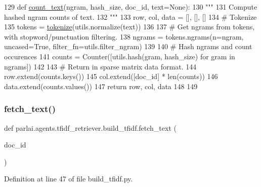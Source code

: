 \begin{DoxyCode}
129 \textcolor{keyword}{def }\hyperlink{namespaceparlai_1_1agents_1_1tfidf__retriever_1_1build__tfidf_a76bae1c966a21d123cb91949d6c8ec20}{count\_text}(ngram, hash\_size, doc\_id, text=None):
130     \textcolor{stringliteral}{"""}
131 \textcolor{stringliteral}{    Compute hashed ngram counts of text.}
132 \textcolor{stringliteral}{    """}
133     row, col, data = [], [], []
134     \textcolor{comment}{# Tokenize}
135     tokens = \hyperlink{namespaceparlai_1_1agents_1_1tfidf__retriever_1_1build__tfidf_a1fdb457e98eb4e4c26047e229686a616}{tokenize}(utils.normalize(text))
136 
137     \textcolor{comment}{# Get ngrams from tokens, with stopword/punctuation filtering.}
138     ngrams = tokens.ngrams(n=ngram, uncased=\textcolor{keyword}{True}, filter\_fn=utils.filter\_ngram)
139 
140     \textcolor{comment}{# Hash ngrams and count occurences}
141     counts = Counter([utils.hash(gram, hash\_size) \textcolor{keywordflow}{for} gram \textcolor{keywordflow}{in} ngrams])
142 
143     \textcolor{comment}{# Return in sparse matrix data format.}
144     row.extend(counts.keys())
145     col.extend([doc\_id] * len(counts))
146     data.extend(counts.values())
147     \textcolor{keywordflow}{return} row, col, data
148 
149 
\end{DoxyCode}
\mbox{\label{namespaceparlai_1_1agents_1_1tfidf__retriever_1_1build__tfidf_a8f16fdf4641c497d12c19f128ed4647a}} 
\subsubsection{\texorpdfstring{fetch\+\_\+text()}{fetch\_text()}}
{\footnotesize\ttfamily def parlai.\+agents.\+tfidf\+\_\+retriever.\+build\+\_\+tfidf.\+fetch\+\_\+text (\begin{DoxyParamCaption}\item[{}]{doc\+\_\+id }\end{DoxyParamCaption})}



Definition at line 47 of file build\+\_\+tfidf.\+py.


